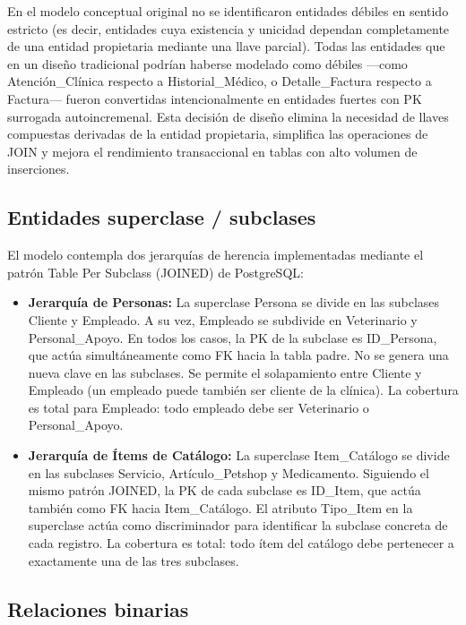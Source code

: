 En el modelo conceptual original no se identificaron entidades débiles en sentido estricto (es decir, entidades cuya existencia y unicidad dependan completamente de una entidad propietaria mediante una llave parcial). Todas las entidades que en un diseño tradicional podrían haberse modelado como débiles —como Atención\_Clínica respecto a Historial\_Médico, o Detalle\_Factura respecto a Factura— fueron convertidas intencionalmente en entidades fuertes con PK surrogada autoincremenal. Esta decisión de diseño elimina la necesidad de llaves compuestas derivadas de la entidad propietaria, simplifica las operaciones de JOIN y mejora el rendimiento transaccional en tablas con alto volumen de inserciones.

\subsection{Entidades superclase / subclases}

El modelo contempla dos jerarquías de herencia implementadas mediante el patrón Table Per Subclass (JOINED) de PostgreSQL:

\begin{itemize}
	\item \textbf{Jerarquía de Personas:} La superclase Persona se divide en las subclases Cliente y Empleado. A su vez, Empleado se subdivide en Veterinario y Personal\_Apoyo. En todos los casos, la PK de la subclase es ID\_Persona, que actúa simultáneamente como FK hacia la tabla padre. No se genera una nueva clave en las subclases. Se permite el solapamiento entre Cliente y Empleado (un empleado puede también ser cliente de la clínica). La cobertura es total para Empleado: todo empleado debe ser Veterinario o Personal\_Apoyo.
	\item \textbf{Jerarquía de Ítems de Catálogo:} La superclase Item\_Catálogo se divide en las subclases Servicio, Artículo\_Petshop y Medicamento. Siguiendo el mismo patrón JOINED, la PK de cada subclase es ID\_Item, que actúa también como FK hacia Item\_Catálogo. El atributo Tipo\_Item en la superclase actúa como discriminador para identificar la subclase concreta de cada registro. La cobertura es total: todo ítem del catálogo debe pertenecer a exactamente una de las tres subclases.
\end{itemize}

\subsection{Relaciones binarias}

